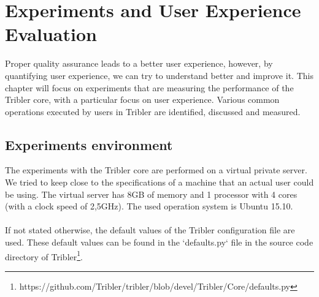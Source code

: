 \chapter{Experiments and User Experience Evaluation}

Proper quality assurance leads to a better user experience, however, by quantifying user experience, we can try to understand better and improve it. This chapter will focus on experiments that are measuring the performance of the Tribler core, with a particular focus on user experience. Various common operations executed by users in Tribler are identified, discussed and measured.

\section{Experiments environment}
The experiments with the Tribler core are performed on a virtual private server. We tried to keep close to the specifications of a machine that an actual user could be using. The virtual server has 8GB of memory and 1 processor with 4 cores (with a clock speed of 2,5GHz). The used operation system is Ubuntu 15.10.\\\\
If not stated otherwise, the default values of the Tribler configuration file are used. These default values can be found in the `defaults.py` file in the source code directory of Tribler\footnote{https://github.com/Tribler/tribler/blob/devel/Tribler/Core/defaults.py}.

